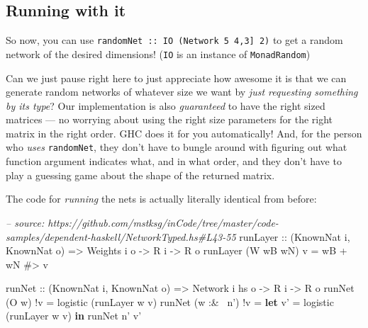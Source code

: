\documentclass[]{article}
\newenvironment{Shaded}{}{}
\newcommand{\KeywordTok}[1]{\textcolor[rgb]{0.00,0.44,0.13}{\textbf{{#1}}}}
\newcommand{\DataTypeTok}[1]{\textcolor[rgb]{0.56,0.13,0.00}{{#1}}}
\newcommand{\CommentTok}[1]{\textcolor[rgb]{0.38,0.63,0.69}{\textit{{#1}}}}
\newcommand{\OtherTok}[1]{\textcolor[rgb]{0.00,0.44,0.13}{{#1}}}
\newcommand{\FunctionTok}[1]{\textcolor[rgb]{0.02,0.16,0.49}{{#1}}}
\newcommand{\NormalTok}[1]{{#1}}
\begin{document}
\subsection{Running with it}\label{running-with-it}

So now, you can use
\texttt{randomNet\ ::\ IO\ (Network\ 5\ \textquotesingle{}{[}4,3{]}\ 2)} to get
a random network of the desired dimensions! (\texttt{IO} is an instance of
\texttt{MonadRandom})

Can we just pause right here to just appreciate how awesome it is that we can
generate random networks of whatever size we want by \emph{just requesting
something by its type}? Our implementation is also \emph{guaranteed} to have the
right sized matrices --- no worrying about using the right size parameters for
the right matrix in the right order. GHC does it for you automatically! And, for
the person who \emph{uses} \texttt{randomNet}, they don't have to bungle around
with figuring out what function argument indicates what, and in what order, and
they don't have to play a guessing game about the shape of the returned matrix.

The code for \emph{running} the nets is actually literally identical from
before:

\begin{Shaded}
\begin{Highlighting}[]
\CommentTok{-- source: https://github.com/mstksg/inCode/tree/master/code-samples/dependent-haskell/NetworkTyped.hs#L43-55}
\OtherTok{runLayer ::} \NormalTok{(}\DataTypeTok{KnownNat} \NormalTok{i, }\DataTypeTok{KnownNat} \NormalTok{o)}
         \OtherTok{=>} \DataTypeTok{Weights} \NormalTok{i o}
         \OtherTok{->} \DataTypeTok{R} \NormalTok{i}
         \OtherTok{->} \DataTypeTok{R} \NormalTok{o}
\NormalTok{runLayer (}\DataTypeTok{W} \NormalTok{wB wN) v }\FunctionTok{=} \NormalTok{wB }\FunctionTok{+} \NormalTok{wN }\FunctionTok{#>} \NormalTok{v}

\OtherTok{runNet ::} \NormalTok{(}\DataTypeTok{KnownNat} \NormalTok{i, }\DataTypeTok{KnownNat} \NormalTok{o)}
       \OtherTok{=>} \DataTypeTok{Network} \NormalTok{i hs o}
       \OtherTok{->} \DataTypeTok{R} \NormalTok{i}
       \OtherTok{->} \DataTypeTok{R} \NormalTok{o}
\NormalTok{runNet (}\DataTypeTok{O} \NormalTok{w)      }\FunctionTok{!}\NormalTok{v }\FunctionTok{=} \NormalTok{logistic (runLayer w v)}
\NormalTok{runNet (w }\FunctionTok{:&~} \NormalTok{n') }\FunctionTok{!}\NormalTok{v }\FunctionTok{=} \KeywordTok{let} \NormalTok{v' }\FunctionTok{=} \NormalTok{logistic (runLayer w v)}
                       \KeywordTok{in}  \NormalTok{runNet n' v'}
\end{Highlighting}
\end{Shaded}
\end{document}
